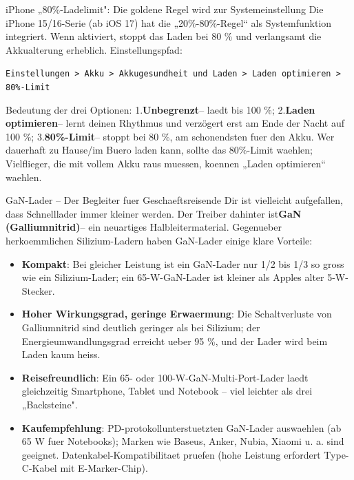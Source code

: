 \begin{tcbinfo}{iPhone „80\%-Ladelimit": Die goldene Regel wird zur Systemeinstellung}
Die iPhone 15/16-Serie (ab iOS 17) hat die „20\%-80\%-Regel“ als Systemfunktion integriert. Wenn aktiviert, stoppt das Laden bei 80 \% und verlangsamt die Akkualterung erheblich. Einstellungspfad:

\texttt{Einstellungen > Akku > Akkugesundheit und Laden > Laden optimieren > 80\%-\allowbreak Limit}

Bedeutung der drei Optionen: 1.\textbf{Unbegrenzt}– laedt bis 100 \%; 2.\textbf{Laden optimieren}– lernt deinen Rhythmus und verzögert erst am Ende der Nacht auf 100 \%; 3.\textbf{80\%-Limit}– stoppt bei 80 \%, am schonendsten fuer den Akku. Wer dauerhaft zu Hause/im Buero laden kann, sollte das 80\%-Limit waehlen; Vielflieger, die mit vollem Akku raus muessen, koennen „Laden optimieren“ waehlen.

\end{tcbinfo}

\begin{tcbinfo}{GaN-Lader – Der Begleiter fuer Geschaeftsreisende}
Dir ist vielleicht aufgefallen, dass Schnelllader immer kleiner werden. Der Treiber dahinter ist\textbf{GaN (Galliumnitrid)}– ein neuartiges Halbleitermaterial. Gegenueber herkoemmlichen Silizium-Ladern haben GaN-Lader einige klare Vorteile:

\begin{itemize}
  \item \textbf{Kompakt}: Bei gleicher Leistung ist ein GaN-Lader nur 1/2 bis 1/3 so gross wie ein Silizium-Lader; ein 65-W-GaN-Lader ist kleiner als Apples alter 5-W-Stecker.
  \item \textbf{Hoher Wirkungsgrad, geringe Erwaermung}: Die Schaltverluste von Galliumnitrid sind deutlich geringer als bei Silizium; der Energieumwandlungsgrad erreicht ueber 95 \%, und der Lader wird beim Laden kaum heiss.
  \item \textbf{Reisefreundlich}: Ein 65- oder 100-W-GaN-Multi-Port-Lader laedt gleichzeitig Smartphone, Tablet und Notebook – viel leichter als drei „Backsteine".
  \item \textbf{Kaufempfehlung}: PD-protokollunterstuetzten GaN-Lader auswaehlen (ab 65 W fuer Notebooks); Marken wie Baseus, Anker, Nubia, Xiaomi u. a. sind geeignet. Datenkabel-Kompatibilitaet pruefen (hohe Leistung erfordert Type-C-Kabel mit E-Marker-Chip).
\end{itemize}

\end{tcbinfo}

